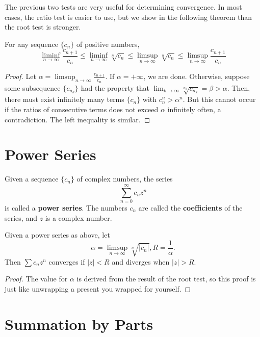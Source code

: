 The previous two tests are very useful for determining convergence. In most cases, the ratio test is easier to use, but we show in the following theorem than the root test is stronger.

\begin{theorem} %
For any sequence $\{c_n\}$ of positive numbers,
\[
	\liminf_{n \to \infty} \frac{c_{n+1}}{c_n} \le \liminf_{n \to \infty} \sqrt[n]{c_n} \le \limsup_{n \to \infty} \sqrt[n]{c_n} \le \limsup_{n \to \infty} \frac{c_{n+1}}{c_n}
\]

\begin{proof}
Let $\alpha = \limsup_{n \to \infty} \frac{c_{n+1}}{c_n}$. If $\alpha = +\infty$, we are done. Otherwise, suppose some subsequence $\{c_{n_k}\}$ had the property that $\lim_{k \to \infty} \sqrt[n_k]{c_{n_k}} = \beta > \alpha$. Then, there must exist infinitely many terms $\{c_n\}$ with $c_n^n > \alpha^n$. But this cannot occur if the ratios of consecutive terms does not exceed $\alpha$ infinitely often, a contradiction. The left inequality is similar.
\end{proof}
\end{theorem}

\section{Power Series}

\begin{definition} %
Given a sequence $\{c_n\}$ of complex numbers, the series
\[
	\sum_{n=0}^{\infty} c_nz^n
\]
is called a \textbf{power series}. The numbers $c_n$ are called the \textbf{coefficients} of the series, and $z$ is a complex number.
\end{definition}

\begin{theorem} %
Given a power series as above, let
\[
	\alpha = \limsup_{n \to \infty} \sqrt[n]{|c_n|}, R = \frac{1}{\alpha}.
\]
Then $\sum c_nz^n$ converges if $|z| < R$ and diverges when $|z| > R$.

\begin{proof}
The value for $\alpha$ is derived from the result of the root test, so this proof is just like unwrapping a present you wrapped for yourself.
\end{proof}
\end{theorem}

\section{Summation by Parts}

